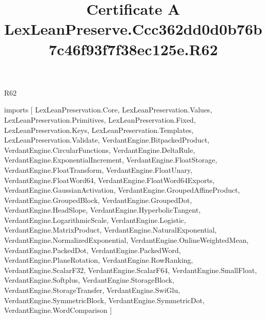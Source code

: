 \begin{lexlean}{R62}
\title{Certificate A LexLeanPreserve.Ccc362dd0d0b76b7c46f93f7f38ec125e.R62}
\begin{coremodule}
imports [
  LexLeanPreservation.Core,
  LexLeanPreservation.Values,
  LexLeanPreservation.Primitives,
  LexLeanPreservation.Fixed,
  LexLeanPreservation.Keys,
  LexLeanPreservation.Templates,
  LexLeanPreservation.Validate,
  VerdantEngine.BitpackedProduct,
  VerdantEngine.CircularFunctions,
  VerdantEngine.DeltaRule,
  VerdantEngine.ExponentialIncrement,
  VerdantEngine.FloatStorage,
  VerdantEngine.FloatTransform,
  VerdantEngine.FloatUnary,
  VerdantEngine.FloatWord64,
  VerdantEngine.FloatWord64Exports,
  VerdantEngine.GaussianActivation,
  VerdantEngine.GroupedAffineProduct,
  VerdantEngine.GroupedBlock,
  VerdantEngine.GroupedDot,
  VerdantEngine.HeadSlope,
  VerdantEngine.HyperbolicTangent,
  VerdantEngine.LogarithmicScale,
  VerdantEngine.Logistic,
  VerdantEngine.MatrixProduct,
  VerdantEngine.NaturalExponential,
  VerdantEngine.NormalizedExponential,
  VerdantEngine.OnlineWeightedMean,
  VerdantEngine.PackedDot,
  VerdantEngine.PackedWord,
  VerdantEngine.PlaneRotation,
  VerdantEngine.RowRanking,
  VerdantEngine.ScalarF32,
  VerdantEngine.ScalarF64,
  VerdantEngine.SmallFloat,
  VerdantEngine.Softplus,
  VerdantEngine.StorageBlock,
  VerdantEngine.StorageTransfer,
  VerdantEngine.SwiGlu,
  VerdantEngine.SymmetricBlock,
  VerdantEngine.SymmetricDot,
  VerdantEngine.WordComparison
]


\end{coremodule}
\end{lexlean}
